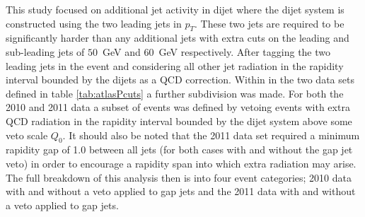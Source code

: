 	This study focused on additional jet activity in dijet where the dijet system
	is constructed using the two leading jets in $p_T$.  These two jets are required
	to be significantly harder than any additional jets with extra cuts on the leading
	and sub-leading jets of $50$~GeV and $60$~GeV respectively.  After tagging the two
	leading jets in the event and considering all other jet radiation in the rapidity
	interval bounded by the dijets as a QCD correction.  Within in the two data sets
	defined in table \eqref{tab:atlasPcuts} a further subdivision was made.  For both the
	2010 and 2011 data a subset of events was defined by vetoing events with extra
	QCD radiation in the rapidity interval bounded by the dijet system above some veto
	scale $Q_0$.  It should also be noted that the 2011 data set required a minimum
	rapidity gap of 1.0 between all jets (for both cases with and without the gap jet
	veto) in order to encourage a rapidity span into which extra radiation may arise.
	The full breakdown of this analysis then is into four event categories;
	2010 data with and without a veto applied to gap jets and the 2011 data with and
	without a veto applied to gap jets.

